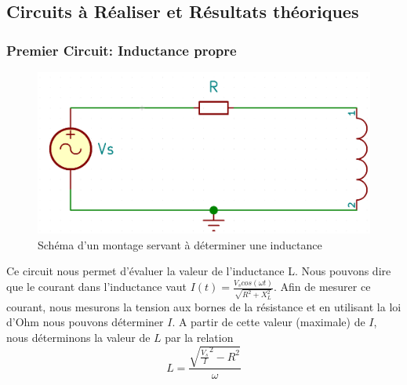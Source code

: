 \documentclass{article}
\begin{document}
\subsection{Circuits à Réaliser et Résultats théoriques}
\subsubsection{Premier Circuit: Inductance propre}
\begin{figure}[h]
    \centering
        \includegraphics[scale = 0.12]{LR.png}
        \caption{Schéma d'un montage servant à déterminer une inductance}
        \label{fig:my_label}
    \end{figure}
Ce circuit nous permet d'évaluer la valeur de l'inductance L. Nous pouvons dire que le courant dans l'inductance vaut
$I(t) = \frac{V_{s}cos(\omega t)}{\sqrt{R^{2} + X_{L}^{2}}}$. Afin de mesurer ce courant, nous mesurons la tension aux
bornes de la résistance et en utilisant la loi d'Ohm nous pouvons déterminer $I$. A partir de cette valeur (maximale) de
$I$, nous déterminons la valeur de $L$ par la relation 
\begin{equation}
    L = \frac{\sqrt{\frac{V_{s}}{I}^2 - R^2}}{\omega}
\end{equation}
\end{document}
